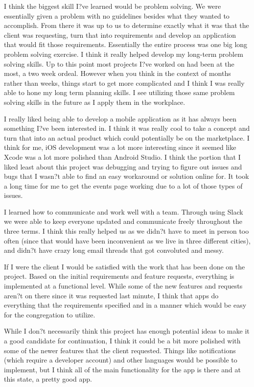 I think the biggest skill I?ve learned would be problem solving. We were essentially given a problem with no guidelines besides what they wanted to accomplish. From there it was up to us to determine exactly what it was that the client was requesting, turn that into requirements and develop an application that would fit those requirements. Essentially the entire process was one big long problem solving exercise. I think it really helped develop my long-term problem solving skills. Up to this point most projects I?ve worked on had been at the most, a two week ordeal. However when you think in the context of months rather than weeks, things start to get more complicated and I think I was really able to hone my long term planning skills. I see utilizing those same problem solving skills in the future as I apply them in the workplace.

I really liked being able to develop a mobile application as it has always been something I?ve been interested in. I think it was really cool to take a concept and turn that into an actual product which could potentially be on the marketplace. I think for me, iOS development was a lot more interesting since it seemed like Xcode was a lot more polished than Android Studio. I think the portion that I liked least about this project was debugging and trying to figure out issues and bugs that I wasn?t able to find an easy workaround or solution online for. It took a long time for me to get the events page working due to a lot of those types of issues.

I learned how to communicate and work well with a team. Through using Slack we were able to keep everyone updated and communicate freely throughout the three terms. I think this really helped us as we didn?t have to meet in person too often (since that would have been inconvenient as we live in three different cities), and didn?t have crazy long email threads that got convoluted and messy.

If I were the client I would be satisfied with the work that has been done on the project. Based on the initial requirements and feature requests, everything is implemented at a functional level. While some of the new features and requests aren?t on there since it was requested last minute, I think that apps do everything that the requirements specified and in a manner which would be easy for the congregation to utilize.

While I don?t necessarily think this project has enough potential ideas to make it a good candidate for continuation, I think it could be a bit more polished with some of the newer features that the client requested. Things like notifications (which require a developer account) and other languages would be possible to implement, but I think all of the main functionality for the app is there and at this state, a pretty good app.
